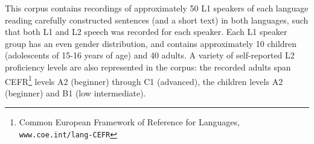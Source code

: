\documentclass[a4paper]{article}
\begin{document}
	This corpus contains recordings of approximately 50 L1 speakers of each language reading carefully constructed sentences (and a short text) in both languages, such that both L1 and L2 speech was recorded for each speaker. Each L1 speaker group has an even gender distribution, and contains approximately 10 children (adolescents of 15-16 years of age) and 40 adults. A variety of self-reported L2 proficiency levels are also represented in the corpus: the recorded adults span CEFR\footnote{Common European Framework of Reference for Languages, \texttt{www.coe.int/lang-CEFR}} levels A2 (beginner) through C1 (advanced), the children levels A2 (beginner) and B1 (low intermediate).
	
\end{document}

